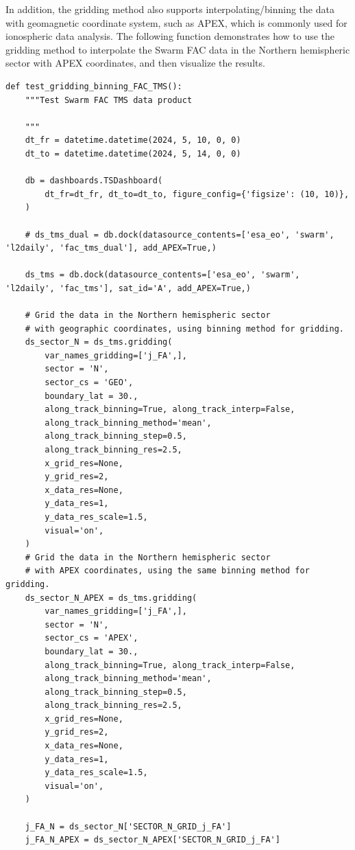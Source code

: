 In addition, the gridding method also supports interpolating/binning the data with geomagnetic coordinate system, such as APEX, which is commonly used for ionospheric data analysis. The following function demonstrates how to use the gridding method to interpolate the Swarm FAC data in the Northern hemispheric sector with APEX coordinates, and then visualize the results.

\begin{verbatim}
def test_gridding_binning_FAC_TMS():
    """Test Swarm FAC TMS data product
    
    """
    dt_fr = datetime.datetime(2024, 5, 10, 0, 0)
    dt_to = datetime.datetime(2024, 5, 14, 0, 0)

    db = dashboards.TSDashboard(
        dt_fr=dt_fr, dt_to=dt_to, figure_config={'figsize': (10, 10)},
    )

    # ds_tms_dual = db.dock(datasource_contents=['esa_eo', 'swarm', 'l2daily', 'fac_tms_dual'], add_APEX=True,)
    
    ds_tms = db.dock(datasource_contents=['esa_eo', 'swarm', 'l2daily', 'fac_tms'], sat_id='A', add_APEX=True,)
   
    # Grid the data in the Northern hemispheric sector 
    # with geographic coordinates, using binning method for gridding.
    ds_sector_N = ds_tms.gridding(
        var_names_gridding=['j_FA',],
        sector = 'N',
        sector_cs = 'GEO',
        boundary_lat = 30.,
        along_track_binning=True, along_track_interp=False,
        along_track_binning_method='mean',
        along_track_binning_step=0.5,
        along_track_binning_res=2.5,
        x_grid_res=None,
        y_grid_res=2,
        x_data_res=None, 
        y_data_res=1, 
        y_data_res_scale=1.5,
        visual='on',
    )
    # Grid the data in the Northern hemispheric sector 
    # with APEX coordinates, using the same binning method for gridding.
    ds_sector_N_APEX = ds_tms.gridding(
        var_names_gridding=['j_FA',],
        sector = 'N',
        sector_cs = 'APEX',
        boundary_lat = 30.,
        along_track_binning=True, along_track_interp=False,
        along_track_binning_method='mean',
        along_track_binning_step=0.5,
        along_track_binning_res=2.5,
        x_grid_res=None,
        y_grid_res=2,
        x_data_res=None, 
        y_data_res=1, 
        y_data_res_scale=1.5,
        visual='on',
    )
    
    j_FA_N = ds_sector_N['SECTOR_N_GRID_j_FA']
    j_FA_N_APEX = ds_sector_N_APEX['SECTOR_N_GRID_j_FA']
    

\end{verbatim}
